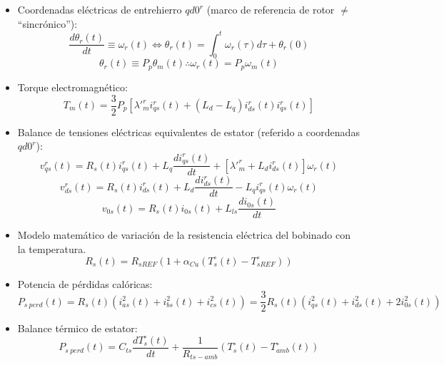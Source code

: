 \documentclass[a4paper, 10pt, onecolumn,journal]{ieeeconf}
\begin{document}
\begin{itemize}
    \item Coordenadas eléctricas de entrehierro $qd0^{r}$ (marco de referencia de rotor $\neq$ “sincrónico”):
    \begin{equation}
        \frac{d\theta_r(t)}{dt} \equiv \omega_r(t) \Leftrightarrow \theta_r(t) = \int_{0}^{t} \omega_r(\tau) d\tau + \theta_r(0)
        \label{Relacion coordenadas electricas y mecanicas}
    \end{equation}
    \begin{equation}
        \theta_r(t) \equiv P_p \theta_m(t) \therefore  \omega_r(t) = P_p \omega_m(t)
        \label{posicion y velocidad rotor}
    \end{equation}
    \item Torque electromagnético:
    \begin{equation}
        T_m(t) = \frac{3}{2} P_p [\lambda'^r_{m} i^r_{qs}(t) + (L_d - L_q) i^r_{ds}(t) i^r_{qs}(t)]
        \label{torque electromagnetico}
    \end{equation}
    \item Balance de tensiones eléctricas equivalentes de estator (referido a coordenadas $qd0^{r}$):
    \begin{equation}
        v^r_{qs}(t) = R_s(t) i^r_{qs}(t) + L_q \frac{di^r_{qs}(t)}{dt} + [\lambda'^r_{m} + L_d i^r_{ds}(t)] \omega_r(t)
        \label{balance de tensiones q}
    \end{equation}
    \begin{equation}
        v^r_{ds}(t) = R_s(t) i^r_{ds}(t) + L_d \frac{di^r_{ds}(t)}{dt} - L_q i^r_{qs}(t) \omega_r(t)
        \label{balance de tensiones d}
    \end{equation}
    \begin{equation}
        v_{0s}(t) = R_s(t) i_{0s}(t) + L_{ls} \frac{di_{0s}(t)}{dt}
        \label{balance de tensiones 0}
    \end{equation}

    \item Modelo matemático de variación de la resistencia eléctrica del bobinado con la temperatura.
    \begin{equation}
        R_s(t) = R_{sREF} \left(1 + \alpha_{Cu} (T_s^{\circ}(t) - T_{sREF}^{\circ})\right)
        \label{Rs}
    \end{equation}

    \item Potencia de pérdidas calóricas:
    \begin{equation}
        P_{s\ perd}(t) = R_s(t) \left(i_{as}^2(t) + i_{bs}^2(t) + i_{cs}^2(t)\right) = \frac{3}{2} R_s(t) \left(i_{qs}^2(t) + i_{ds}^2(t) + 2 i_{0s}^2(t)\right)
        \label{potencia de perdidas}
    \end{equation}
    \item Balance térmico de estator:
    \begin{equation}
        P_{s\ perd}(t) = C_{ts} \frac{dT_s^{\circ}(t)}{dt} + \frac{1}{R_{ts-amb}} \left(T_s^{\circ}(t) - T_{amb}^{\circ}(t)\right)
        \label{balance termico estator}
    \end{equation}


\end{itemize}
\end{document}
